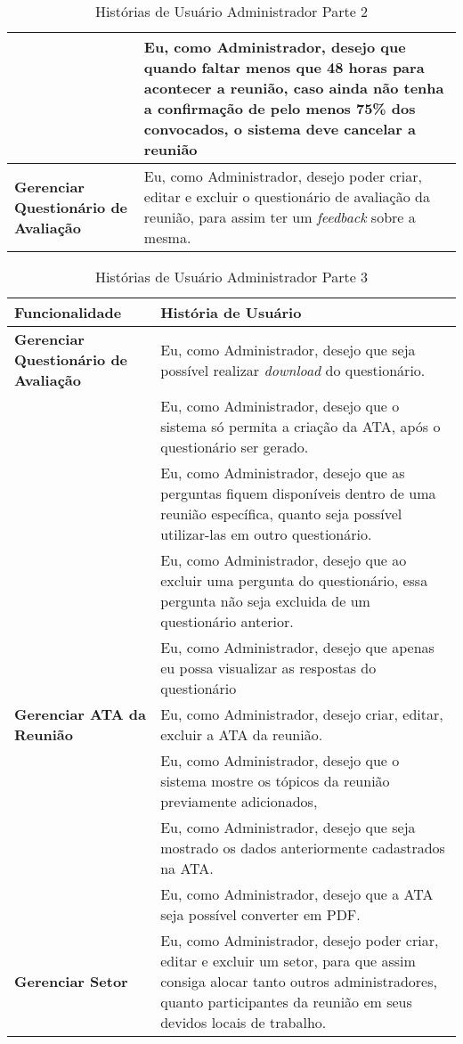 \begin{table}[H]
\begin{tabular}{|p{5.0cm}|p{10.0cm}|}
	& Eu, como Administrador, desejo que quando faltar menos que 48 horas para acontecer a reunião, caso ainda não tenha a confirmação de pelo menos 75\% dos convocados, o sistema deve cancelar a reunião \\ \hline
	\textbf{Gerenciar Questionário de Avaliação} & Eu, como Administrador, desejo poder criar, editar e excluir o questionário de avaliação da reunião, para assim ter um \textit{feedback} sobre a mesma. \\ \hline 
	\end{tabular}
	 \caption{Histórias de Usuário Administrador Parte 2}
	 \label{tab:historias_de_usuario_administrador_parte2}
\end{table}

\begin{table}[H]
	\begin{tabular}{|p{5.0cm}|p{10.0cm}|} 
	\hline
	\textbf{Funcionalidade} & \textbf{História de Usuário} \\ \hline
	\textbf{Gerenciar Questionário de Avaliação} & Eu, como Administrador, desejo que seja possível realizar \textit{download} do questionário. \\ \hline
	& Eu, como Administrador, desejo que o sistema só permita a criação da ATA, após o questionário ser gerado. \\ \hline
	& Eu, como Administrador, desejo que as perguntas fiquem disponíveis dentro de uma reunião específica, quanto seja possível utilizar-las em outro questionário. \\ \hline
	& Eu, como Administrador, desejo que ao excluir uma pergunta do questionário, essa pergunta não seja excluida de um questionário anterior. \\ \hline
	& Eu, como Administrador, desejo que apenas eu possa visualizar as respostas do questionário \\ \hline
	\textbf{Gerenciar ATA da Reunião} & Eu, como Administrador, desejo criar, editar, excluir a ATA da reunião.\\ \hline
	& Eu, como Administrador, desejo que o sistema mostre os tópicos da reunião previamente adicionados, \\ \hline
	& Eu, como Administrador, desejo que seja mostrado os dados anteriormente cadastrados na ATA. \\ \hline
	& Eu, como Administrador, desejo que a ATA seja possível converter em PDF. \\ \hline
	\textbf{Gerenciar Setor} & Eu, como Administrador, desejo poder criar, editar e excluir um setor, para que assim consiga alocar tanto outros administradores, quanto participantes da reunião em seus devidos locais de trabalho. \\ \hline
	\end{tabular}
	 \caption{Histórias de Usuário Administrador Parte 3}
	 \label{tab:historias_de_usuario_administrador_parte3}
\end{table}

